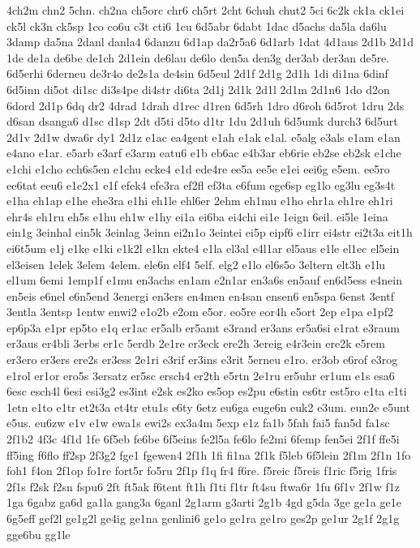{4ch2m
chn2
5chn.
ch2na
ch5orc
chr6
ch5rt
2cht
6chuh
chut2
5ci
6c2k
ck1a
ck1ei
ck5l
ck3n
ck5sp
1co
co6u
c3t
cti6
1cu
6d5abr
6dabt
1dac
d5achs
da5la
da6lu
3damp
da5na
2danl
danla4
6danzu
6d1ap
da2r5a6
6d1arb
1dat
4d1aus
2d1b
2d1d
1de
de1a
de6be
de1ch
2d1ein
de6lau
de6lo
den5a
den3g
der3ab
der3an
de5re.
6d5erhi
6derneu
de3r4o
de2s1a
de4sin
6d5eul
2d1f
2d1g
2d1h
1di
di1na
6dinf
6d5inn
di5ot
di1sc
di3s4pe
di4str
di6ta
2d1j
2d1k
2d1l
2d1m
2d1n6
1do
d2on
6dord
2d1p
6dq
dr2
4drad
1drah
d1rec
d1ren
6d5rh
1dro
d6roh
6d5rot
1dru
2ds
d6san
dsanga6
d1sc
d1sp
2dt
d5ti
d5to
d1tr
1du
2d1uh
6d5umk
durch3
6d5urt
2d1v
2d1w
dwa6r
dy1
2d1z
e1ac
ea4gent
e1ah
e1ak
e1al.
e5alg
e3als
e1am
e1an
e4ano
e1ar.
e5arb
e3arf
e3arm
eatu6
e1b
eb6ac
e4b3ar
eb6rie
eb2se
eb2sk
e1che
e1chi
e1cho
ech6s5en
e1chu
ecke4
e1d
ede4re
ee5a
ee5e
e1ei
eei6g
e5em.
ee5ro
ee6tat
eeu6
e1e2x1
e1f
efek4
efe3ra
ef2fl
ef3ta
e6fum
ege6sp
eg1lo
eg3lu
eg3s4t
e1ha
eh1ap
e1he
ehe3ra
e1hi
eh1le
ehl6er
2ehm
eh1mu
e1ho
ehr1a
eh1re
eh1ri
ehr4s
eh1ru
eh5s
e1hu
eh1w
e1hy
ei1a
ei6ba
ei4chi
ei1e
1eign
6eil.
ei5le
1eina
ein1g
3einhal
ein5k
3einlag
3einn
ei2n1o
3eintei
ei5p
eipf6
e1irr
ei4str
ei2t3a
eit1h
ei6t5um
e1j
e1ke
e1ki
e1k2l
e1kn
ekte4
e1la
el3al
e4l1ar
el5aus
e1le
el1ec
el5ein
el3eisen
1elek
3elem
4elem.
ele6n
elf4
5elf.
elg2
e1lo
el6s5o
3eltern
elt3h
e1lu
el1um
6emi
1emp1f
e1mu
en3achs
en1am
e2n1ar
en3a6s
en5auf
en6d5ess
e4nein
en5eis
e6nel
e6n5end
3energi
en3ers
en4men
en4san
ensen6
en5spa
6enst
3entf
3entla
3entsp
1entw
enwi2
e1o2b
e2om
e5or.
eo5re
eor4h
e5ort
2ep
e1pa
e1pf2
ep6p3a
e1pr
ep5to
e1q
er1ac
er5alb
er5amt
e3rand
er3ans
er5a6si
e1rat
e3raum
er3aus
er4bli
3erbs
er1c
5erdb
2e1re
er3eck
ere2h
3ereig
e4r3ein
ere2k
e5rem
er3ero
er3ers
ere2s
er3ess
2e1ri
e3rif
er3ins
e3rit
5erneu
e1ro.
er3ob
e6rof
e3rog
e1rol
er1or
ero5s
3ersatz
er5sc
ersch4
er2th
e5rtn
2e1ru
er5uhr
er1um
e1s
esa6
6esc
esch4l
6esi
esi3g2
es3int
e2sk
es2ko
es5op
es2pu
e6stin
es6tr
est5ro
e1ta
e1ti
1etn
e1to
e1tr
et2t3a
et4tr
etu1s
e6ty
6etz
eu6ga
euge6n
euk2
e3um.
eun2e
e5unt
e5us.
eu6zw
e1v
e1w
ewa1s
ewi2s
ex3a4m
5exp
e1z
fa1b
5fah
fai5
fan5d
fa1sc
2f1b2
4f3c
4f1d
1fe
6f5eb
fe6be
6f5eins
fe2l5a
fe6lo
fe2mi
6femp
fen5ei
2f1f
ffe5i
ff5ing
f6flo
ff2sp
2f3g2
fge1
fgewen4
2f1h
1fi
fi1na
2f1k
f5leb
6f5lein
2f1m
2f1n
1fo
foh1
f4on
2f1op
fo1re
fort5r
fo5ru
2f1p
f1q
fr4
f6re.
f5reic
f5reis
f1ric
f5rig
1fris
2f1s
f2sk
f2sn
fspu6
2ft
ft5ak
f6tent
ft1h
f1ti
f1tr
ft4su
ftwa6r
1fu
6f1v
2f1w
f1z
1ga
6gabz
ga6d
ga1la
gang3a
6ganl
2g1arm
g3arti
2g1b
4gd
g5da
3ge
ge1a
ge1e
6g5eff
gef2l
ge1g2l
ge4ig
ge1na
genlini6
ge1o
ge1ra
ge1ro
ges2p
ge1ur
2g1f
2g1g
gge6bu
gg1le
}
